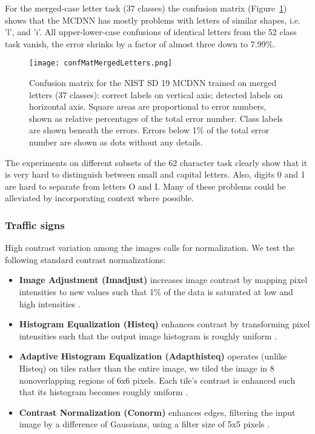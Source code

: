 \documentclass[a4paper]{article}
\begin{document}
For the merged-case letter task (37 classes) the confusion matrix (Figure~\ref{Fig:confMatMergedLetters}) shows that the MCDNN has mostly problems with letters of similar shapes, i.e. 'l', and 'i'. All upper-lower-case confusions of identical letters from the 52 class task vanish, the error shrinks by a factor of almost three down to 7.99\%.

\begin{figure}[ht!]
\hfill
\begin{center}
\texttt{[image: confMatMergedLetters.png]}
\end{center}
\caption{Confusion matrix for the NIST SD 19 MCDNN trained on merged letters (37 classes): correct labels on vertical axis; detected labels on horizontal axis. Square areas are proportional to error numbers, shown as relative percentages of the total error number. Class labels are shown beneath the errors. Errors below 1\% of the total error number are shown as dots without any details.}
\label{Fig:confMatMergedLetters}
\end{figure}

The experiments on different subsets of the 62 character task clearly show that it is very hard to distinguish between small and capital letters. Also, digits 0 and 1 are hard to separate from letters O and I. Many of these problems could be alleviated by incorporating context  where possible.

\subsubsection{Traffic signs}

High contrast variation among the images calls for normalization. We test the following standard contrast normalizations:

\begin{itemize}
\item
{\bf Image Adjustment (Imadjust)} increases image contrast by mapping pixel intensities to new values such that 1\% of the data is saturated at low and high intensities \cite{matlab:2010}.
\item
{\bf Histogram Equalization (Histeq)} enhances contrast by transforming pixel intensities such that the output image histogram is roughly uniform \cite{matlab:2010}.
\item
{\bf Adaptive Histogram Equalization (Adapthisteq)} operates (unlike Histeq) on tiles rather than the entire image, we tiled the image in 8 nonoverlapping regions of 6x6 pixels. Each tile's contrast is enhanced such that its histogram becomes roughly uniform \cite{matlab:2010}.
\item
{\bf Contrast Normalization (Conorm)} enhances edges, filtering the input image by a difference of Gaussians, using a filter size of 5x5 pixels \cite{Sermanet:2011}. 
\end{itemize}
\end{document}
